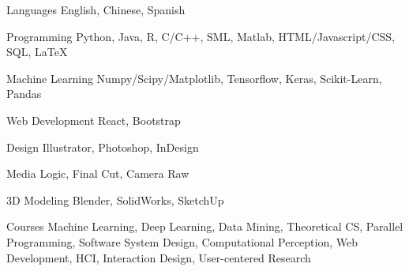 

\begin{cvskills}

  \cvskill
    {Languages} %
    {English, Chinese, Spanish} %

  \cvskill
    {Programming} %
    {Python, Java, R, C/C++, SML, Matlab, HTML/Javascript/CSS, SQL, LaTeX} %

  \cvskill
    {Machine Learning} %
    {Numpy/Scipy/Matplotlib, Tensorflow, Keras, Scikit-Learn, Pandas} %

  \cvskill
    {Web Development} %
    {React, Bootstrap} %

  \cvskill
    {Design} %
    {Illustrator, Photoshop, InDesign} %

  \cvskill
    {Media} %
    {Logic, Final Cut, Camera Raw} %

  \cvskill
    {3D Modeling} %
    {Blender, SolidWorks, SketchUp} %

  \cvskill
    {Courses} %
    {Machine Learning, Deep Learning, Data Mining, Theoretical CS, Parallel Programming, Software System Design, 
    \linebreak Computational Perception, Web Development, HCI, Interaction Design, User-centered Research} %

\end{cvskills}
